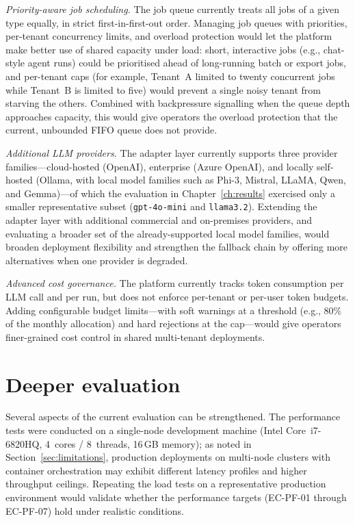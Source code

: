 \documentclass[a4paper,noexaminfo]{sapthesis}
\begin{document}
\emph{Priority-aware job scheduling.}  The job queue currently treats all
jobs of a given type equally, in strict first-in-first-out order.
Managing job queues with priorities, per-tenant concurrency limits, and
overload protection would let the platform make better use of shared
capacity under load: short, interactive jobs (e.g., chat-style agent
runs) could be prioritised ahead of long-running batch or export jobs, and
per-tenant caps (for example, Tenant~A limited to twenty concurrent jobs
while Tenant~B is limited to five) would prevent a single noisy tenant
from starving the others.  Combined with backpressure signalling when the
queue depth approaches capacity, this would give operators the overload
protection that the current, unbounded FIFO queue does not provide.

\emph{Additional LLM providers.}  The adapter layer currently supports
three provider families---cloud-hosted (OpenAI), enterprise (Azure
OpenAI), and locally self-hosted (Ollama, with local model families such
as Phi-3, Mistral, LLaMA, Qwen, and Gemma)---of which the evaluation in
Chapter~\ref{ch:results} exercised only a smaller representative subset
(\texttt{gpt-4o-mini} and \texttt{llama3.2}).  Extending the adapter
layer with additional commercial and on-premises providers, and
evaluating a broader set of the already-supported local model families,
would broaden deployment flexibility and strengthen the fallback chain by
offering more alternatives when one provider is degraded.

\emph{Advanced cost governance.}  The platform currently tracks token
consumption per LLM call and per run, but does not enforce per-tenant
or per-user token budgets.  Adding configurable budget limits---with
soft warnings at a threshold (e.g., 80\% of the monthly allocation) and
hard rejections at the cap---would give operators finer-grained cost
control in shared multi-tenant deployments.

\section{Deeper evaluation}
\label{sec:fw-eval}

Several aspects of the current evaluation can be strengthened.  The
performance tests were conducted on a single-node development machine
(Intel Core~i7-6820HQ, 4~cores / 8~threads, 16\,GB memory); as noted in
Section~\ref{sec:limitations}, production deployments on multi-node
clusters with container orchestration may exhibit different latency
profiles and higher throughput ceilings.  Repeating the load tests on a
representative production environment would validate whether the
performance targets (EC-PF-01 through EC-PF-07) hold under realistic
conditions.
\end{document}
